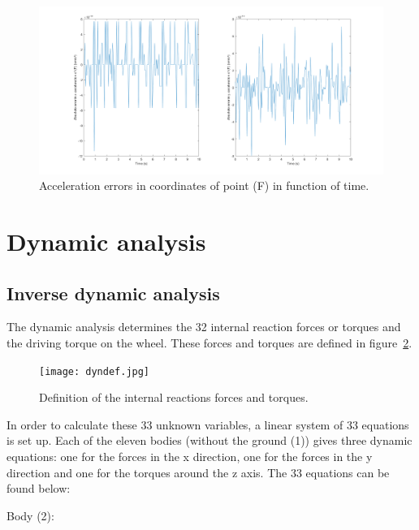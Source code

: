 \documentclass[a4paper]{article}
\begin{document}
\begin{figure}
	\centering
	
	\includegraphics[width = \textwidth]{contracc.png}
	
	\caption{Acceleration errors in coordinates of point (F) in function of time.}
	\label{fig:contracc}
	
\end{figure}

\section{Dynamic analysis}

\subsection{Inverse dynamic analysis}

The dynamic analysis determines the 32 internal reaction forces or torques and the driving torque on the wheel. These forces and torques are defined in figure~\ref{fig:dyndef}.

\begin{figure}[h]
	\centering
	
	\texttt{[image: dyndef.jpg]}
	
	\caption{Definition of the internal reactions forces and torques.}
	\label{fig:dyndef}
	
\end{figure}

In order to calculate these 33 unknown variables, a linear system of 33 equations is set up. Each of the eleven bodies (without the ground (1)) gives three dynamic equations: one for the forces in the x direction, one for the forces in the y direction and one for the torques around the z axis. The 33 equations can be found below:

\bigskip

Body (2):
\end{document}
